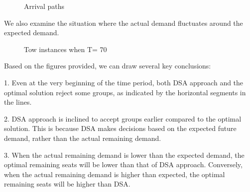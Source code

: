 \newpage


\begin{figure}[h]
  \centering
  \caption{Arrival paths}
\end{figure}


We also examine the situation where the actual demand fluctuates around the expected demand.

\newpage

\begin{figure}[h]
  \centering
  \caption{Tow instances when T= 70}
\end{figure}

Based on the figures provided, we can draw several key conclusions:

1. Even at the very beginning of the time period, both DSA approach and the optimal solution reject some groups, as indicated by the horizontal segments in the lines.

2. DSA approach is inclined to accept groups earlier compared to the optimal solution. This is because DSA makes decisions based on the expected future demand, rather than the actual remaining demand.

3. When the actual remaining demand is lower than the expected demand, the optimal remaining seats will be lower than that of DSA approach. Conversely, when the actual remaining demand is higher than expected, the optimal remaining seats will be higher than DSA.


